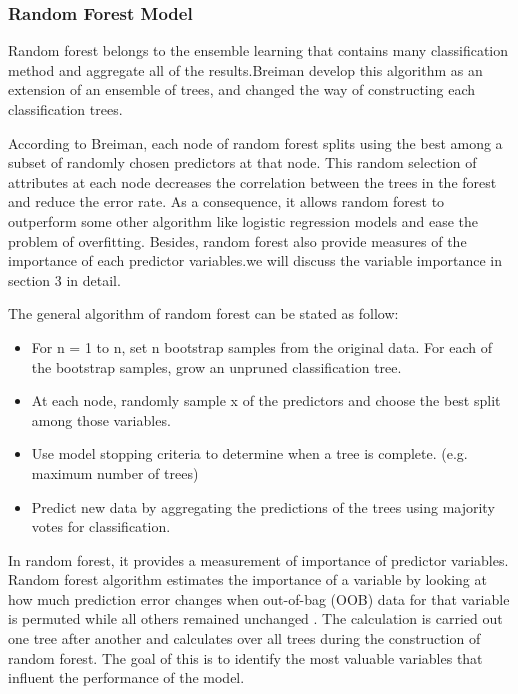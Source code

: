 \documentclass[a4paper,11pt]{article}
\begin{document}
\subsubsection{Random Forest Model}
Random forest belongs to the ensemble learning that contains many classification method and aggregate all of the results.Breiman \cite{breiman2001random} develop this algorithm as an extension of an ensemble of trees, and changed the way of constructing each classification trees. 

According to Breiman,\cite{breiman2001random} each node of random forest splits using the best among a subset of randomly chosen predictors at that node. This random selection of attributes at each node decreases the correlation between the trees in the forest and reduce the error rate. As a consequence, it allows random forest to outperform some other algorithm like logistic regression models\citealp{peters2004predictive} and ease the problem of overfitting. Besides, random forest also provide measures of the importance of each predictor variables\cite{breiman2001random}.we will discuss the variable importance in section 3 in detail.

The general algorithm of random forest can be stated as follow:
\begin{itemize}
	\item For n = 1 to n, set n bootstrap samples from the original data. For each of the bootstrap samples, grow an unpruned classification tree. 
	\item At each node, randomly sample x of the predictors and choose the best split among those variables.
	\item  Use model stopping criteria to determine when a tree is complete. (e.g. maximum number of trees)
	\item Predict new data by aggregating the predictions of the trees using majority votes for classification.
\end{itemize}

In random forest, it provides a measurement of importance of predictor variables. Random forest algorithm estimates the importance of a variable by looking at how much prediction error changes when out-of-bag (OOB) data for that variable is permuted while all others remained unchanged \cite{archer2008empirical}. The calculation is carried out one tree after another and calculates over all trees during the construction of random forest. The goal of this is to identify the most valuable variables that influent the performance of the model.
\end{document}
